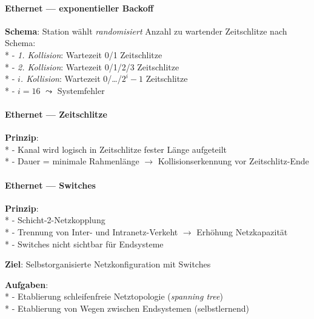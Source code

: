 \paragraph{Ethernet --- exponentieller Backoff}
\begin{items}
  \item \textbf{Schema}: Station wählt \emph{randomisiert} Anzahl zu wartender Zeitschlitze nach Schema: \\*
    - \emph{1. Kollision}: Wartezeit 0/1 Zeitschlitze \\*
    - \emph{2. Kollision}: Wartezeit 0/1/2/3 Zeitschlitze \\*
    - \emph{\( i \). Kollision}: Wartezeit 0/\dots/\( 2^i-1 \) Zeitschlitze \\*
    - \( i = 16 \) \( \leadsto \) Systemfehler
\end{items}

\paragraph{Ethernet --- Zeitschlitze}
\begin{items}
  \item \textbf{Prinzip}: \\*
    - Kanal wird logisch in Zeitschlitze fester Länge aufgeteilt \\*
    - Dauer = minimale Rahmenlänge \( \to \) Kollisionserkennung vor Zeitschlitz-Ende
\end{items}

\paragraph{Ethernet --- Switches}
\begin{items}
  \item \textbf{Prinzip}: \\*
    - Schicht-2-Netzkopplung \\*
    - Trennung von Inter- und Intranetz-Verkeht \( \to \) Erhöhung Netzkapazität \\*
    - Switches nicht sichtbar für Endsysteme
  \item \textbf{Ziel}: Selbstorganisierte Netzkonfiguration mit Switches
  \item \textbf{Aufgaben}: \\*
    - Etablierung schleifenfreie Netztopologie (\emph{spanning tree}) \\*
    - Etablierung von Wegen zwischen Endsystemen (selbstlernend)
\end{items}

